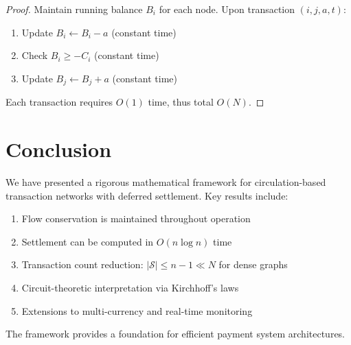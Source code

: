 \documentclass[12pt]{article}
\begin{document}
\begin{proof}
Maintain running balance $B_i$ for each node. Upon transaction $(i,j,a,t)$:
\begin{enumerate}
    \item Update $B_i \leftarrow B_i - a$ (constant time)
    \item Check $B_i \geq -C_i$ (constant time)
    \item Update $B_j \leftarrow B_j + a$ (constant time)
\end{enumerate}
Each transaction requires $O(1)$ time, thus total $O(N)$.
\end{proof}

\section{Conclusion}

We have presented a rigorous mathematical framework for circulation-based transaction networks with deferred settlement. Key results include:

\begin{enumerate}
    \item Flow conservation is maintained throughout operation
    \item Settlement can be computed in $O(n \log n)$ time
    \item Transaction count reduction: $|\mathcal{S}| \leq n-1 \ll N$ for dense graphs
    \item Circuit-theoretic interpretation via Kirchhoff's laws
    \item Extensions to multi-currency and real-time monitoring
\end{enumerate}

The framework provides a foundation for efficient payment system architectures.
\end{document}
